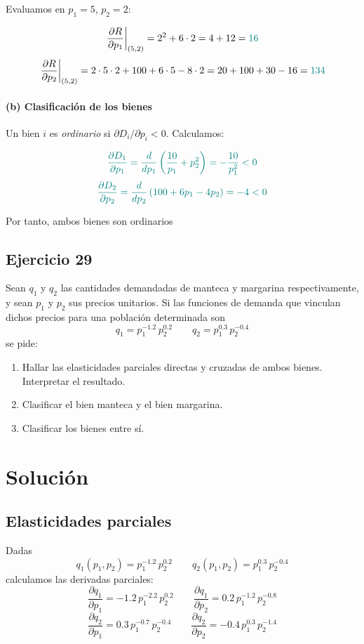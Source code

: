 \documentclass{article}
\begin{document}
Evaluamos en \(p_1=5\), \(p_2=2\):

\[
\left.\frac{\partial R}{\partial p_1}\right|_{(5,2)}
= 2^2 + 6\cdot2
= 4 + 12
= {\color{teal}16}
\]
\[
\left.\frac{\partial R}{\partial p_2}\right|_{(5,2)}
= 2\cdot5\cdot2 + 100 + 6\cdot5 - 8\cdot2
= 20 + 100 + 30 - 16
= {\color{teal}134}
\]

\paragraph{(b) Clasificación de los bienes}  
Un bien \(i\) es \emph{ordinario} si \(\partial D_i/\partial p_i<0\). Calculamos:

\[\color{teal}
\frac{\partial D_1}{\partial p_1}
= \frac{d}{dp_1}\left(\frac{10}{p_1} + p_2^2\right)
= -\frac{10}{p_1^2} < 0
\]
\[\color{teal}
\frac{\partial D_2}{\partial p_2}
= \frac{d}{dp_2}\left(100 + 6p_1 - 4p_2\right)
= -4 < 0
\]

{\color{teal}Por tanto, ambos bienes son ordinarios}
\newpage
\subsection{Ejercicio 29}

Sean \(q_1\) y \(q_2\) las cantidades demandadas de manteca y margarina respectivamente, y sean \(p_1\) y \(p_2\) sus precios unitarios. Si las funciones de demanda que vinculan dichos precios para una población determinada son
\[
q_1 = p_1^{-1.2}\,p_2^{0.2}
\qquad
q_2 = p_1^{0.3}\,p_2^{-0.4}
\]
se pide:
\begin{enumerate}
  \item Hallar las elasticidades parciales directas y cruzadas de ambos bienes. Interpretar el resultado.
  \item Clasificar el bien manteca y el bien margarina.
  \item Clasificar los bienes entre sí.
\end{enumerate}

\newpage
\section*{Solución}

\subsection*{Elasticidades parciales}

Dadas
\[
q_1(p_1,p_2)=p_1^{-1.2}\,p_2^{0.2}
\qquad
q_2(p_1,p_2)=p_1^{0.3}\,p_2^{-0.4}
\]
calculamos las derivadas parciales:
\[
\frac{\partial q_1}{\partial p_1}
=-1.2\,p_1^{-2.2}\,p_2^{0.2}
\qquad
\frac{\partial q_1}{\partial p_2}
=0.2\,p_1^{-1.2}\,p_2^{-0.8}
\]
\[
\frac{\partial q_2}{\partial p_1}
=0.3\,p_1^{-0.7}\,p_2^{-0.4}
\qquad
\frac{\partial q_2}{\partial p_2}
=-0.4\,p_1^{0.3}\,p_2^{-1.4}
\]
\end{document}
